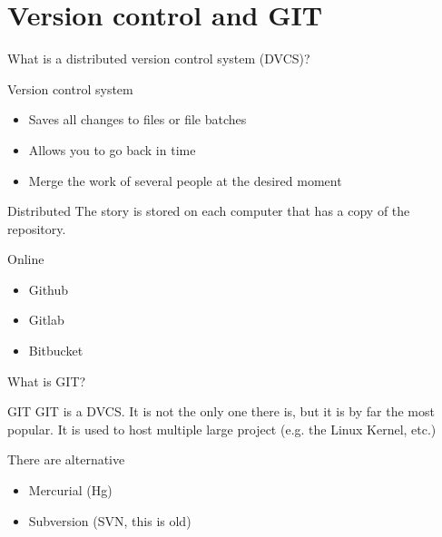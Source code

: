 \documentclass[c,11pt,xcolor=dvipsnames, aspectratio=169]{beamer}
\begin{document}
\section{Version control and GIT}

\begin{frame}[fragile]{What is a distributed version control system (DVCS)?}

\begin{block}{Version control system}
	\begin{itemize}
	\item Saves all changes to files or file batches
	\item Allows you to go back in time
	\item Merge the work of several people at the desired moment
	\end{itemize}
\end{block}

\begin{block}{Distributed}
	The story is stored on each computer that has a copy of the repository.
\end{block}


\begin{block}{Online}
	\begin{itemize}
		\item Github
		\item Gitlab
		\item Bitbucket
		\end{itemize}
\end{block}

\end{frame}


\begin{frame}[fragile]{What is GIT?}

	\begin{block}{GIT}
 GIT is a DVCS. It is not the only one there is, but it is by far the most popular. It is used to host multiple large project (e.g. the Linux Kernel, etc.)
	\end{block}

	\begin{block}{There are alternative}
		\begin{itemize}
			\item Mercurial (Hg)
			\item Subversion (SVN, this is old)
		\end{itemize}
	\end{block}


	
	\end{frame}
\end{document}
